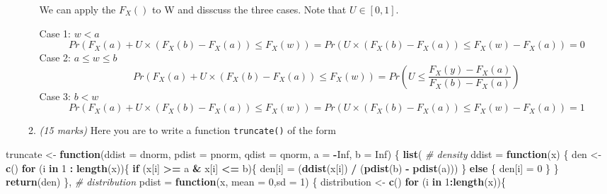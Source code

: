 \documentclass[
  9pt,
]{article}
\newenvironment{Shaded}{\begin{snugshade}}{\end{snugshade}}
\newcommand{\CommentTok}[1]{\textcolor[rgb]{0.56,0.35,0.01}{\textit{#1}}}
\newcommand{\ControlFlowTok}[1]{\textcolor[rgb]{0.13,0.29,0.53}{\textbf{#1}}}
\newcommand{\DataTypeTok}[1]{\textcolor[rgb]{0.13,0.29,0.53}{#1}}
\newcommand{\DecValTok}[1]{\textcolor[rgb]{0.00,0.00,0.81}{#1}}
\newcommand{\KeywordTok}[1]{\textcolor[rgb]{0.13,0.29,0.53}{\textbf{#1}}}
\newcommand{\NormalTok}[1]{#1}
\newcommand{\OperatorTok}[1]{\textcolor[rgb]{0.81,0.36,0.00}{\textbf{#1}}}
\newcommand{\OtherTok}[1]{\textcolor[rgb]{0.56,0.35,0.01}{#1}}
\newcommand{\StringTok}[1]{\textcolor[rgb]{0.31,0.60,0.02}{#1}}
\begin{document}
\begin{enumerate}
\begin{enumerate}
    We can apply the \(F_X()\) to W and disscuss the three cases. Note
    that \(U \in [0,1]\).

    Case 1: \(w < a\)
    \[Pr(F_X(a) + U \times (F_X(b) - F_X(a)) \le F_X(w)) = Pr(U \times (F_X(b) - F_X(a)) \le F_X(w) -  F_X(a)) = 0\]
    Case 2: \(a \le w \le b\)
    \[Pr(F_X(a) + U \times (F_X(b) - F_X(a)) \le F_X(w)) = Pr(U \le \frac{F_X(y) - F_X(a)}{F_X(b) - F_X(a)})\]
    Case 3: \(b < w\)
    \[Pr(F_X(a) + U \times (F_X(b) - F_X(a)) \le F_X(w)) = Pr(U \times (F_X(b) - F_X(a)) \le F_X(w) -  F_X(a)) = 1\]
  \item
    \emph{(15 marks)} Here you are to write a function
    \texttt{truncate()} of the form
  \end{enumerate}
\end{enumerate}

\begin{Shaded}
\begin{Highlighting}[]
\NormalTok{  truncate <{-}}\StringTok{ }\ControlFlowTok{function}\NormalTok{(}\DataTypeTok{ddist =}\NormalTok{ dnorm, }\DataTypeTok{pdist =}\NormalTok{ pnorm, }\DataTypeTok{qdist =}\NormalTok{ qnorm, }\DataTypeTok{a =} \OperatorTok{{-}}\OtherTok{Inf}\NormalTok{, }\DataTypeTok{b =} \OtherTok{Inf}\NormalTok{) \{}
    \KeywordTok{list}\NormalTok{(}
      \CommentTok{\# density}
      \DataTypeTok{ddist =} \ControlFlowTok{function}\NormalTok{(x) \{}
\NormalTok{        den <{-}}\StringTok{ }\KeywordTok{c}\NormalTok{()}
        \ControlFlowTok{for}\NormalTok{ (i }\ControlFlowTok{in} \DecValTok{1} \OperatorTok{:}\StringTok{ }\KeywordTok{length}\NormalTok{(x))\{}
          \ControlFlowTok{if}\NormalTok{ (x[i] }\OperatorTok{>=}\StringTok{ }\NormalTok{a }\OperatorTok{\&}\StringTok{ }\NormalTok{x[i] }\OperatorTok{<=}\StringTok{ }\NormalTok{b)\{}
\NormalTok{            den[i] =}\StringTok{ }\NormalTok{(}\KeywordTok{ddist}\NormalTok{(x[i]) }\OperatorTok{/}\StringTok{ }\NormalTok{(}\KeywordTok{pdist}\NormalTok{(b) }\OperatorTok{{-}}\StringTok{ }\KeywordTok{pdist}\NormalTok{(a)))}
\NormalTok{          \} }\ControlFlowTok{else}\NormalTok{ \{}
\NormalTok{            den[i] =}\StringTok{ }\DecValTok{0}
\NormalTok{          \}}
\NormalTok{        \}}
        \KeywordTok{return}\NormalTok{(den)}
\NormalTok{      \},}
      \CommentTok{\# distribution}
      \DataTypeTok{pdist =} \ControlFlowTok{function}\NormalTok{(x, }\DataTypeTok{mean =} \DecValTok{0}\NormalTok{,}\DataTypeTok{sd =} \DecValTok{1}\NormalTok{) \{}
\NormalTok{        distribution <{-}}\StringTok{ }\KeywordTok{c}\NormalTok{()}
        \ControlFlowTok{for}\NormalTok{ (i }\ControlFlowTok{in} \DecValTok{1}\OperatorTok{:}\KeywordTok{length}\NormalTok{(x))\{}

\end{Highlighting}
\end{Shaded}
\end{document}
